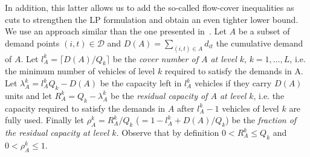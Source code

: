 In addition, this latter allows us to add the so-called flow-cover inequalities as cuts to strengthen the LP formulation and obtain an even tighter lower bound.
We use an approach similar than the one presented in~\cite{levi_approximation_2008}.
Let $A$ be a subset of demand points $(i,t)\in\mathcal{D}$ and $D(A)=\sum_{(i,t)\in A} d_{it}$ the cumulative demand of $A$.
Let $l^k_A=\lceil D(A)/Q_k \rceil$ be the {\em cover number of $A$ at level $k$}, $k=1,\ldots,L$, i.e. the minimum number of vehicles of level $k$ required to satisfy the demands in A. 
Let $\lambda^k_A = l^k_A Q_k - D(A)$ be the capacity left in $l^k_A$ vehicles if they carry $D(A)$ units and let $R^k_A = Q_k - \lambda^k_A$ be the {\em residual capacity of $A$ at level $k$}, i.e. the capacity required to satisfy the demands in $A$ after $l^k_A - 1$ vehicles of level $k$ are fully used.
Finally let $\rho^k_A = R^k_A/Q_k$ ($= 1 - l^k_A + D(A)/Q_k$) be the {\em fraction of the residual capacity at level $k$}. 
Observe that by definition $0<R^k_A \leq Q_k$ and $0<\rho^k_A\leq 1$. 

